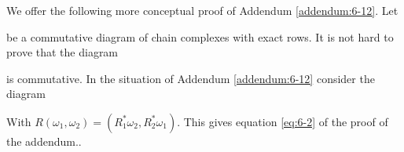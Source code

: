 \begin{remark}\label{remark:6-16}
  We offer the following more conceptual proof of Addendum \ref{addendum:6-12}. Let

\begin{center}
\end{center}

be a commutative diagram of chain complexes with exact rows. It is not hard
to prove that the diagram
\begin{center}
\end{center}

is commutative. In the situation of Addendum \ref{addendum:6-12} consider the diagram
\begin{center}
\end{center}

With $R(\omega_1, \omega_2) = (R^*_1\omega_2, R^*_2\omega_1)$. This gives equation \eqref{eq:6-2} of the proof of the
addendum..
\end{remark}
